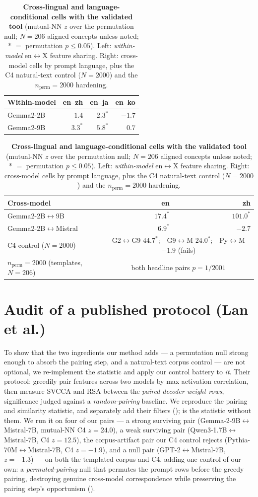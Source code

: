 \begin{table}[h]
\centering
\caption{\textbf{Cross-lingual and language-conditional cells with the validated tool}
(mutual-NN $z$ over the permutation null; $N=206$ aligned concepts unless noted; * $=$
permutation $p\leq0.05$). Left: \emph{within-model} en$\leftrightarrow$X feature sharing.
Right: cross-model cells by prompt language, plus the C4 natural-text control ($N=2000$)
and the $n_{\text{perm}}{=}2000$ hardening.}
\label{tab:xling_cells}
\small
\begin{tabular}{lrrr}
\toprule
Within-model & en--zh & en--ja & en--ko \\
\midrule
Gemma2-2B & $1.4$ & $2.3^{*}$ & $-1.7$ \\
Gemma2-9B & $3.3^{*}$ & $5.8^{*}$ & $0.7$ \\
\bottomrule
\end{tabular}
\hspace{1.2em}
\begin{tabular}{lrr}
\toprule
Cross-model & en & zh \\
\midrule
Gemma2-2B$\leftrightarrow$9B & $17.4^{*}$ & $101.0^{*}$ \\
Gemma2-2B$\leftrightarrow$Mistral & $6.9^{*}$ & $-2.7$ \\
\midrule
C4 control ($N{=}2000$) & \multicolumn{2}{c}{G2$\leftrightarrow$G9 $44.7^{*}$;\ \ G9$\leftrightarrow$M $24.0^{*}$;\ \ Py$\leftrightarrow$M $-1.9$ (fails)} \\
$n_{\text{perm}}{=}2000$ (templates, $N{=}206$) & \multicolumn{2}{c}{both headline pairs $p=1/2001$} \\
\bottomrule
\end{tabular}
\end{table}

\section{Audit of a published protocol (Lan et al.)}\label{app:lan}

To show that the two ingredients our method adds --- a permutation null strong enough to
absorb the pairing step, and a natural-text corpus control --- are not optional, we
re-implement the \citet{lan2024universal} statistic and apply our control battery to
\emph{it}. Their protocol: greedily pair features across two models by max activation
correlation, then measure SVCCA and RSA between the \emph{paired decoder-weight rows},
significance judged against a \emph{random-pairing} baseline. We reproduce the pairing and
similarity statistic, and separately add their filters (); 
is the statistic without them. We run it on four of our
pairs --- a strong surviving pair (Gemma-2-9B$\leftrightarrow$Mistral-7B, mutual-NN
C4 $z=24.0$), a weak surviving pair (Qwen3-1.7B$\leftrightarrow$Mistral-7B, C4 $z=12.5$),
the corpus-artifact pair our C4 control rejects (Pythia-70M$\leftrightarrow$Mistral-7B,
C4 $z=-1.9$), and a null pair (GPT-2$\leftrightarrow$Mistral-7B, $z=-1.3$) --- on both the
templated corpus and C4, adding one control of our own: a \emph{permuted-pairing} null that
permutes the prompt rows before the greedy pairing, destroying genuine cross-model
correspondence while preserving the pairing step's opportunism ().

